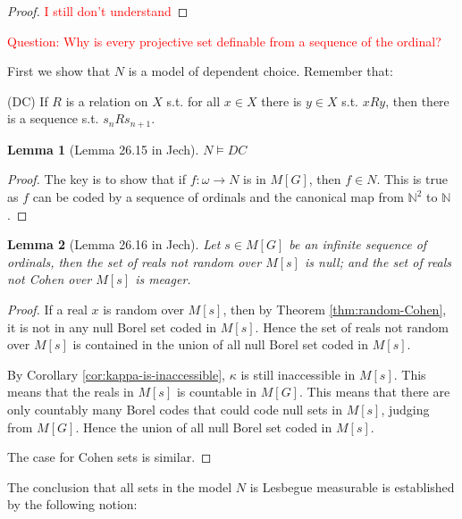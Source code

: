 \documentclass{article}
\newtheorem{lemma}{Lemma}
\begin{document}
\begin{proof}
    \textcolor{red}{I still don't understand} 
\end{proof}







\textcolor{red}{Question: Why is every projective set definable from a sequence of the ordinal? }

First we show that $N$ is a model of dependent choice. Remember that:

(DC) If $R$ is a relation on $X$ s.t. for all $x\in X$ there is $y\in X$ s.t. $xRy$, then there is a sequence s.t. $s_nRs_{n+1}$.

\begin{lemma}[Lemma 26.15 in Jech]
    $N\models DC$
\end{lemma}

\begin{proof}
    The key is to show that if $f:\omega\to N$ is in $M[G]$, then $f\in N$. This is true as $f$ can be coded by a sequence of ordinals and the canonical map from $\mathbb{N}^2$ to $\mathbb{N}$.
\end{proof}

\begin{lemma}[Lemma 26.16 in Jech]\label{lem:41}
    Let $s\in M[G]$ be an infinite sequence of ordinals, then the set of reals not random over $M[s]$ is null; and the set of reals not Cohen over $M[s]$ is meager.
\end{lemma}

\begin{proof}
    If a real $x$ is random over $M[s]$, then by Theorem \ref{thm:random-Cohen}, it is not in any null Borel set coded in $M[s]$. Hence the set of reals not random over $M[s]$ is contained in the union of all null Borel set coded in $M[s]$. 

    By Corollary \ref{cor:kappa-is-inaccessible}, $\kappa$ is still inaccessible in $M[s]$. This means that the reals in $M[s]$ is countable in $M[G]$. This means that there are only countably many Borel codes that could code null sets in $M[s]$, judging from $M[G]$. Hence the union of all null Borel set coded in $M[s]$. 
    
    The case for Cohen sets is similar.
\end{proof}

The conclusion that all sets in the model $N$ is Lesbegue measurable is established by the following notion:
\end{document}
